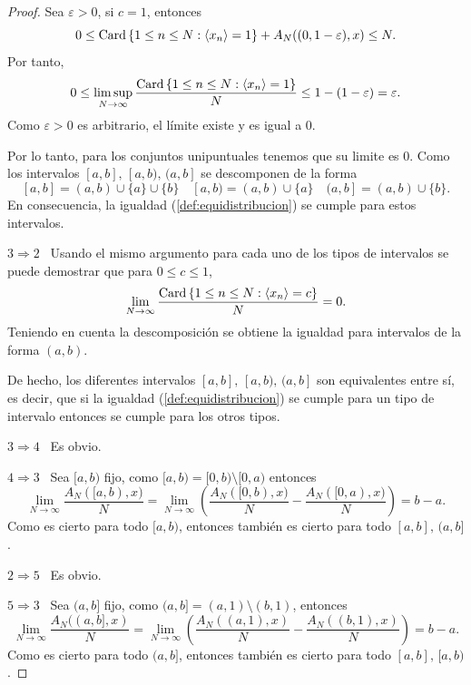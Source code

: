 \begin{proof}
    Sea $\varepsilon > 0$, si $c = 1$, entonces
    \[
        0 \leq 
        \operatorname{Card} \left\{1\leq n \leq N :\langle x_n \rangle=1\right\} +
        A_N((0, 1-\varepsilon), x) \leq
        N.
    \]
    Por tanto,
    \[
        0 \leq 
        \limsup_{N \to \infty} \frac{\operatorname{Card} \left\{1\leq n \leq N :\langle x_n \rangle=1\right\}}{N} \leq
        1 - (1-\varepsilon) = 
        \varepsilon.
    \]  
    Como $\varepsilon > 0$ es arbitrario, el límite existe y es igual a $0$.

    Por lo tanto, para los conjuntos unipuntuales tenemos que su limite es $0$.
    Como los intervalos $[a,b], \,[a,b), \,(a,b]$ se descomponen de la forma
    \[
        [a,b] = (a,b) \cup \{a\} \cup \{b\} \quad
        [a,b) = (a,b) \cup \{a\} \quad
        (a,b] = (a,b) \cup \{b\}.
    \]
    En consecuencia, la igualdad (\ref{def:equidistribucion}) se cumple para estos intervalos.
    
    $3 \Longrightarrow 2$ \, Usando el mismo argumento para cada uno de los tipos de intervalos
    se puede demostrar que para $0 \leq c \leq 1$,
    \[
        \lim_{N \to \infty} \frac{\operatorname{Card} \left\{1\leq n \leq N :\langle x_n \rangle=c\right\}}{N} = 0.
    \]
    Teniendo en cuenta la descomposición se obtiene la igualdad para intervalos de la forma $(a,b)$.

    De hecho, los diferentes intervalos $[a,b], \,[a,b), \,(a,b]$ son equivalentes entre sí, 
    es decir, que si la igualdad (\ref{def:equidistribucion}) se cumple para un tipo de 
    intervalo entonces se cumple para los otros tipos.
    
    $3 \Longrightarrow 4$ \, Es obvio.

    $4 \Longrightarrow 3$ \, Sea $[a,b)$ fijo, como $[a,b) = [0,b) \setminus [0,a)$ entonces 
    \[
        \lim_{N \to \infty} \frac{A_N([a,b), x)}{N} = 
        \lim_{N \to \infty} \left(\frac{A_N([0,b), x)}{N} - \frac{A_N([0,a), x)}{N}\right) = 
        b - a.
    \]
    Como es cierto para todo $[a,b)$, entonces también es cierto para todo $[a,b], \,(a,b]$.

    $2 \Longrightarrow 5$ \, Es obvio.

    $5 \Longrightarrow 3$ \, Sea $(a,b]$ fijo, como $(a,b]=(a,1) \setminus (b,1)$, entonces
    \[
        \lim_{N \to \infty} \frac{A_N((a,b], x)}{N} = 
        \lim_{N \to \infty} \left(\frac{A_N((a,1), x)}{N} - \frac{A_N((b,1), x)}{N}\right) = 
        b - a.
    \]
    Como es cierto para todo $(a,b]$, entonces también es cierto para todo $[a,b], \,[a,b)$.
    

\end{proof}
